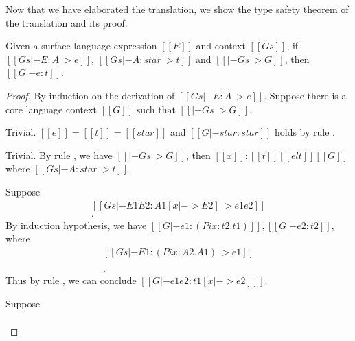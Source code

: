 Now that we have elaborated the translation, we show the type safety
theorem of the translation and its proof.

\begin{theorem}
Given a surface language expression $[[E]]$ and context $[[Gs]]$, 
if $[[Gs |- E:A ~> e]]$, $[[Gs |- A:star ~> t]]$ and $[[|- Gs ~> G]]$, then
$[[G |- e:t]]$.
\end{theorem}

\begin{proof}
    By induction on the derivation of $[[Gs |- E : A ~> e]]$. Suppose there is
a core language context $[[G]]$ such that $[[|- Gs ~> G]]$.
    \begin{description}
        \renewcommand{\hlmath}[1]{#1}
        \item[Case $\ottdruleTRXXAx{}$:] $\quad$ \\ Trivial. $[[e]] = [[t]] = [[star]]$ and
$[[G |- star:star]]$ holds by rule .
        \item[Case $\ottdruleTRXXVar{}$:] $\quad$ \\ Trivial. By rule , we
have $[[|- Gs ~> G]]$, then $[[x]]:[[t]] [[elt]] [[G]]$ where $[[Gs |-
A:star~>t]]$.
        \item[Case $\ottdruleTRXXApp{}$:] $\quad$ \\ Suppose
            \[\begin{array}{l}
            [[Gs |- E1 E2 : A1[x |-> E2] ~> e1 e2]] \\
            [[Gs |- A1[x |-> E2] : star ~> t1 [x |-> e2] ]].
            \end{array} \]
            By induction
            hypothesis, we have 
            $
            [[G |- e1 : (Pi x:t2.t1)]],
            [[G |- e2:t2]],
            $
            where
            \[\begin{array}{l}
             [[Gs |- E1 : (Pi x:A2.A1) ~> e1]] \\
              [[Gs |- (Pi x:A2.A1) : star ~> (Pi x:t2.t1)]] \\
              [[Gs |- E2 : A2 ~> e2]] \\
              [[Gs |- A2 : star ~> t2]].
            \end{array}\] Thus by rule , we can conclude $[[G |- e1 e2 : t1 [x |-> e2] ]]$.
        \item[Case $\ottdruleTRXXLam{}$:] $\quad$ \\ Suppose
            \[\begin{array}{l}

\end{array}\]
\end{description}
\end{proof}
